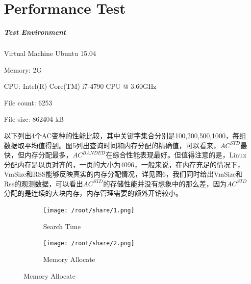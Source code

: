 \documentclass{article}
\begin{document}
\section{Performance Test}
\subparagraph{Test Environment}
 \begin{list}{}{}
 \item  Virtual Machine Ubuntu 15.04
 \item  Memory: 2G
 \item  CPU: Intel(R) Core(TM) i7-4790 CPU @ 3.60GHz
 \item  File count: 6253
 \item  File size: 862404 kB
 \end{list}

以下列出4个AC变种的性能比较，其中关键字集合分别是100,200,500,1000，每组数据取平均值得到。图5列出查询时间和内存分配的精确值，可以看来，$AC^{STD}$最快，但内存分配最多，$AC^{BANDED}$在综合性能表现最好。但值得注意的是，Linux分配内存是以页对齐的，一页的大小为4096，一般来说，在内存充足的情况下，VmSize和RSS能够反映真实的内存分配情况，详见图6，我们同时给出VmSize和Rss的观测数据，可以看出$AC^{STD}$的存储性能并没有想象中的那么差，因为$AC^{STD}$分配的是连续的大块内存，内存管理需要的额外开销较小。
\begin{figure}[h]
  \centering
  \caption{\textsc{Performance Comparison}}
\begin{subfigure}[b]{0.3\textwidth}
  \texttt{[image: /root/share/1.png]}
  \caption{Search Time}
  \label{fig:search}
\end{subfigure}

\begin{subfigure}[b]{0.3\textwidth}
  \texttt{[image: /root/share/2.png]}
  \caption{Memory Allocate}
  \label{fig:mem}
\end{subfigure}
\end{figure}
\end{document}
